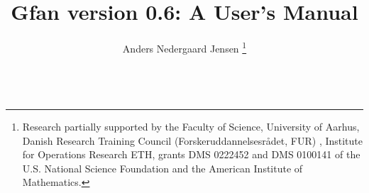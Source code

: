 

\def\name{Gfan }
\def\nameversion{gfan0.6}
\def\exename{gfan}




\title{\name version 0.6: A User's Manual}
\author{Anders Nedergaard Jensen
\thanks{Research partially supported by the Faculty of Science, University of Aarhus, Danish Research Training Council (Forskeruddannelsesr\aa det, FUR) , Institute for Operations Research ETH, grants DMS 0222452 and DMS 0100141 of the U.S. National Science Foundation and the American Institute of Mathematics.
}
\\
\\
}
\maketitle

